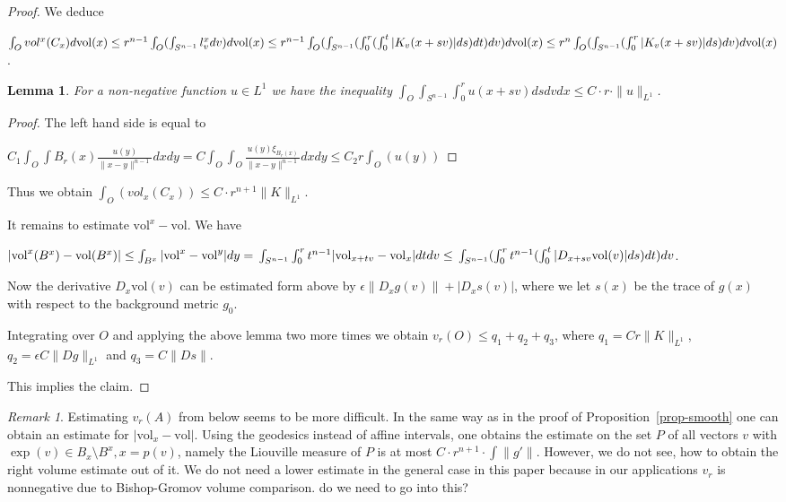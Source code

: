 \documentclass[12pt,leqno]{amsart}
\numberwithin{equation}{section}
\newtheorem{lem}[thm]{Lemma}
\theoremstyle{definition}
\theoremstyle{remark}
\newtheorem{rem}[thm]{Remark}
\newcommand{\vol}{\mathrm{vol}}
\begin{document}
\begin{proof}
    We deduce

    $\int _O vol ^x (C_x) d\vol (x) \leq r^{n-1} \int _O (\int _{S^{n-1}} l_v ^x dv) d\vol (x) \leq \\
    r^{n-1} \int _O (\int _{S^{n-1}} (\int _0 ^r (\int _0 ^t |K_v (x+sv)| ds)dt)dv)d\vol (x) \leq \\
    r^n \int _O (\int _{S^{n-1}} (\int _0 ^r |K_v (x+sv)| ds) dv)d\vol (x)$.


    \begin{lem}
    For a non-negative function $u\in L^1$ we have the inequality
    $\int _O \int _{S^{n-1}} \int _0^r u(x+sv) ds dv dx \leq C \cdot r \cdot \|u\| _{L^1}$.
    \end{lem}


     \begin{proof}
     The left hand side is equal to

     $C_1 \int _O \int B_r (x) \frac {u(y)}  {\|x-y\| ^{n-1}} dx dy = C \int _O \int _O \frac {u(y) \xi _{B_r (x)}}
     {\|x-y\| ^{n-1}} dx dy \leq C_2 r  \int _O (u(y))$
     \end{proof}


      Thus we obtain $\int _O (vol _x (C_x)) \leq C \cdot r^{n+1} \|K\| _{L^1}$.


      It remains to estimate $\vol ^x - \vol$. We have

      $|\vol ^x (B^x) -\vol (B^x)| \leq \int _ {B^x} |\vol ^x -\vol ^y| dy = \\
      \int _{S^{n-1}} \int _0 ^r  t^{n-1} | \vol _{x+tv} - \vol _x| dt dv \leq  \\
       \int _{ S^{n-1}} (\int _0 ^r t^{n-1} (\int _0 ^t  |D_{x+sv} \vol (v)| ds) dt) dv$.

      Now the derivative $D_x \vol (v)$ can be estimated form above by $\epsilon \|D_xg (v)\| + | D_x s (v)|$,
      where we let $s(x)$ be the trace of $g(x)$ with respect to the background metric $g_0$.

      Integrating over $O$ and applying the above lemma two more times we obtain
      $v_r (O) \leq q_1 +q_2 +q_3$, where
      $q_1 = C r \|K\| _{L^1}$, $q_2 = \epsilon C \| Dg\| _{L^1} $ and $q_3 = C \|Ds\|$.

      This implies the claim.
    \end{proof}


\begin{rem}
Estimating  $v_r (A)$ from below seems to be more difficult. In the same way as in the proof of Proposition~\ref{prop-smooth} one  can obtain an estimate for $|\vol _x -\vol |$.
Using the geodesics instead of affine intervals, one obtains the estimate on the set $P$ of all
vectors $v$ with $\exp (v) \in B_x \setminus B^x, x=p(v)$, namely the Liouville measure of  $P$ is
at most $C\cdot r^{n+1} \cdot \int \|g'\|$.  However, we  do not see, how to obtain the right volume estimate out of it. We do not need a lower estimate  in the general case in this paper because in our applications $v_r$ is nonnegative due to Bishop-Gromov volume comparison. {\color{red} do we need to go into this?}
\end{rem}
\end{document}
